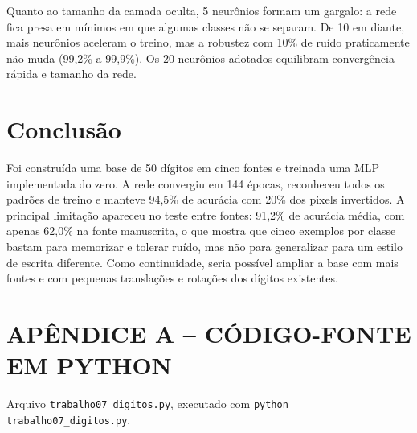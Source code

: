 \documentclass[12pt,a4paper]{article}
\begin{document}
Quanto ao tamanho da camada oculta, 5 neurônios formam um gargalo: a rede fica presa em
mínimos em que algumas classes não se separam. De 10 em diante, mais neurônios aceleram o
treino, mas a robustez com 10\% de ruído praticamente não muda (99,2\% a 99,9\%). Os 20
neurônios adotados equilibram convergência rápida e tamanho da rede.

\section{Conclusão}

Foi construída uma base de 50 dígitos em cinco fontes e treinada uma MLP implementada do
zero. A rede convergiu em 144 épocas, reconheceu todos os padrões de treino e manteve
94,5\% de acurácia com 20\% dos pixels invertidos. A principal limitação apareceu no teste
entre fontes: 91,2\% de acurácia média, com apenas 62,0\% na fonte manuscrita, o que
mostra que cinco exemplos por classe bastam para memorizar e tolerar ruído, mas não para
generalizar para um estilo de escrita diferente. Como continuidade, seria possível ampliar
a base com mais fontes e com pequenas translações e rotações dos dígitos existentes.

\newpage
\pagestyle{abnt}
\begin{singlespace}

\end{singlespace}

\newpage
\appendix
\renewcommand{\thesection}{\Alph{section}}
\section*{APÊNDICE A -- CÓDIGO-FONTE EM PYTHON}
\noindent Arquivo \texttt{trabalho07\_digitos.py}, executado com
\texttt{python trabalho07\_digitos.py}.
\begin{singlespace}

\end{singlespace}
\end{document}
